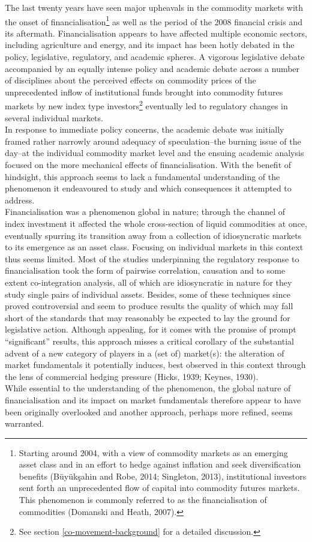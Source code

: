 \documentclass[]{elsarticle} %
\begin{document}
The last twenty years have seen major upheavals in the commodity markets with the onset of financialisation\footnote{Starting around 2004, with a view of commodity markets as an emerging asset class and in an effort to hedge against inflation and seek diversification benefits (Büyükşahin and Robe, 2014; Singleton, 2013), institutional investors sent forth an unprecedented flow of capital into commodity futures markets. This phenomenon is commonly referred to as the financialisation of commodities (Domanski and Heath, 2007).} as well as the period of the 2008 financial crisis and its aftermath. Financialisation appears to have affected multiple economic sectors, including agriculture and energy, and its impact has been hotly debated in the policy, legislative, regulatory, and academic spheres. A vigorous legislative debate accompanied by an equally intense policy and academic debate across a number of disciplines about the perceived effects on commodity prices of the unprecedented inflow of institutional funds brought into commodity futures markets by new index type investors\footnote{See section \ref{co-movement-background} for a detailed discussion.} eventually led to regulatory changes in several individual markets.\\
In response to immediate policy concerns, the academic debate was initially framed rather narrowly around adequacy of speculation--the burning issue of the day--at the individual commodity market level and the ensuing academic analysis focused on the more mechanical effects of financialisation. With the benefit of hindsight, this approach seems to lack a fundamental understanding of the phenomenon it endeavoured to study and which consequences it attempted to address.\\
Financialisation was a phenomenon global in nature; through the channel of index investment it affected the whole cross-section of liquid commodities at once, eventually spurring its transition away from a collection of idiosyncratic markets to its emergence as an asset class. Focusing on individual markets in this context thus seems limited. Most of the studies underpinning the regulatory response to financialisation took the form of pairwise correlation, causation and to some extent co-integration analysis, all of which are idiosyncratic in nature for they study single pairs of individual assets. Besides, some of these techniques since proved controversial and seem to produce results the quality of which may fall short of the standards that may reasonably be expected to lay the ground for legislative action. Although appealing, for it comes with the promise of prompt ``significant'' results, this approach misses a critical corollary of the substantial advent of a new category of players in a (set of) market(s): the alteration of market fundamentals it potentially induces, best observed in this context through the lens of commercial hedging pressure (Hicks, 1939; Keynes, 1930).\\
While essential to the understanding of the phenomenon, the global nature of financialisation and its impact on market fundamentals therefore appear to have been originally overlooked and another approach, perhaps more refined, seems warranted.
\end{document}
